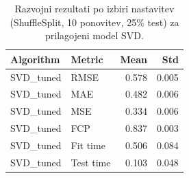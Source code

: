 \begin{table}[h]
\centering
\caption{Razvojni rezultati po izbiri nastavitev (ShuffleSplit, 10 ponovitev, 25\% test) za prilagojeni model SVD.}
\label{tab:cv_results_tuned_svd}
\begin{tabular}{llrr}
\toprule
Algorithm & Metric & Mean & Std \\
\midrule
SVD\_tuned & RMSE & 0.578 & 0.005 \\
SVD\_tuned & MAE & 0.482 & 0.006 \\
SVD\_tuned & MSE & 0.334 & 0.006 \\
SVD\_tuned & FCP & 0.837 & 0.003 \\
SVD\_tuned & Fit time & 0.506 & 0.084 \\
SVD\_tuned & Test time & 0.103 & 0.048 \\
\bottomrule
\end{tabular}

\end{table}
